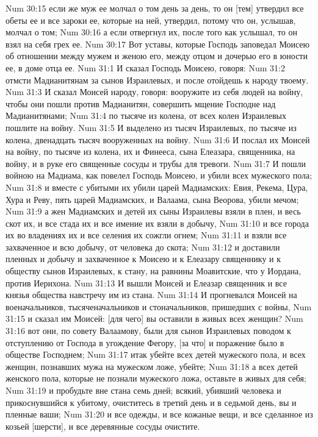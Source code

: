 Num 30:15  если же муж ее молчал о том день за день, то он [тем] утвердил все обеты ее и все зароки ее, которые на ней, утвердил, потому что он, услышав, молчал о том;
Num 30:16  а если отвергнул их, после того как услышал, то он взял на себя грех ее.
Num 30:17  Вот уставы, которые Господь заповедал Моисею об отношении между мужем и женою его, между отцом и дочерью его в юности ее, в доме отца ее.
Num 31:1  И сказал Господь Моисею, говоря:
Num 31:2  отмсти Мадианитянам за сынов Израилевых, и после отойдешь к народу твоему.
Num 31:3  И сказал Моисей народу, говоря: вооружите из себя людей на войну, чтобы они пошли против Мадианитян, совершить мщение Господне над Мадианитянами;
Num 31:4  по тысяче из колена, от всех колен Израилевых пошлите на войну.
Num 31:5  И выделено из тысяч Израилевых, по тысяче из колена, двенадцать тысяч вооруженных на войну.
Num 31:6  И послал их Моисей на войну, по тысяче из колена, их и Финееса, сына Елеазара, священника, на войну, и в руке его священные сосуды и трубы для тревоги.
Num 31:7  И пошли войною на Мадиама, как повелел Господь Моисею, и убили всех мужеского пола;
Num 31:8  и вместе с убитыми их убили царей Мадиамских: Евия, Рекема, Цура, Хура и Реву, пять царей Мадиамских, и Валаама, сына Веорова, убили мечом;
Num 31:9  а жен Мадиамских и детей их сыны Израилевы взяли в плен, и весь скот их, и все стада их и все имение их взяли в добычу,
Num 31:10  и все города их во владениях их и все селения их сожгли огнем;
Num 31:11  и взяли все захваченное и всю добычу, от человека до скота;
Num 31:12  и доставили пленных и добычу и захваченное к Моисею и к Елеазару священнику и к обществу сынов Израилевых, к стану, на равнины Моавитские, что у Иордана, против Иерихона.
Num 31:13  И вышли Моисей и Елеазар священник и все князья общества навстречу им из стана.
Num 31:14  И прогневался Моисей на военачальников, тысяченачальников и стоначальников, пришедших с войны,
Num 31:15  и сказал им Моисей: [для чего] вы оставили в живых всех женщин?
Num 31:16  вот они, по совету Валаамову, были для сынов Израилевых поводом к отступлению от Господа в угождение Фегору, [за что] и поражение было в обществе Господнем;
Num 31:17  итак убейте всех детей мужеского пола, и всех женщин, познавших мужа на мужеском ложе, убейте;
Num 31:18  а всех детей женского пола, которые не познали мужеского ложа, оставьте в живых для себя;
Num 31:19  и пробудьте вне стана семь дней; всякий, убивший человека и прикоснувшийся к убитому, очиститесь в третий день и в седьмой день, вы и пленные ваши;
Num 31:20  и все одежды, и все кожаные вещи, и все сделанное из козьей [шерсти], и все деревянные сосуды очистите.
